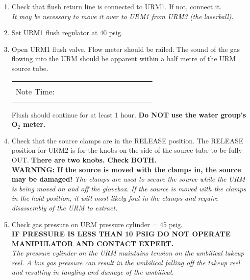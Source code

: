 \begin{enumerate}
  
\item\checkbox Check that flush return line is connected to
  URM1.  If not, connect it.\\
  \small
  {\em It may be necessary to move it over to URM1 from URM3 (the laserball).
  }
  \normalsize

\item\checkbox Set URM1 flush regulator at 40 psig.

\item\checkbox Open URM1 flush valve.  Flow meter should be railed.
     The sound of the gas flowing into the URM should be apparent within
     a half metre of the URM source tube.
     \begin{center}
     \begin{tabular}{|l|}
     \hline
      \\
     Note Time:~~~~~~~~~~~~~~~~~~~~~~~~\\
      \\
     \hline
     \end{tabular}
     \end{center}

   Flush should continue for at least 1 hour.
   {\bf Do NOT use the water group's O$_2$ meter.}

  
\item\checkbox Check that the source clamps are in the RELEASE position.  
   The RELEASE position for URM2 is for the knobs on the side of the source
   tube to be fully OUT.  {\bf There are two knobs.  Check BOTH.}\\
   {\bf 
     WARNING:  If the source is moved with the clamps in, the source
     may be damaged!
   }
  \small
  {\em
   The clamps are used to secure the source while the URM is being moved
   on and off the glovebox.  If the source is moved with the clamps in
   the hold position, it will most likely foul in the clamps and
   require disassembly of the URM to extract.
  }
  \normalsize
 
\item\checkbox Check gas pressure on URM pressure cylinder = 45 psig.\\
   {\bf 
   IF PRESSURE IS LESS THAN 10 PSIG DO NOT OPERATE MANIPULATOR
   AND CONTACT EXPERT.
   }\\
   \small
   {\em
     The pressure cylinder on the URM maintains tension on the umbilical
     takeup reel.  A low gas pressure can result in the umbilical falling
     off the takeup reel and resulting in tangling and damage of the
     umbilical.
   }
   \normalsize
  

\end{enumerate}
